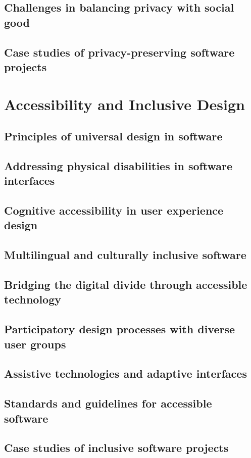 \subsection{Challenges in balancing privacy with social good}
\subsection{Case studies of privacy-preserving software projects}

\newpage

\section{Accessibility and Inclusive Design}
\subsection{Principles of universal design in software}
\subsection{Addressing physical disabilities in software interfaces}
\subsection{Cognitive accessibility in user experience design}
\subsection{Multilingual and culturally inclusive software}
\subsection{Bridging the digital divide through accessible technology}
\subsection{Participatory design processes with diverse user groups}
\subsection{Assistive technologies and adaptive interfaces}
\subsection{Standards and guidelines for accessible software}
\subsection{Case studies of inclusive software projects}

